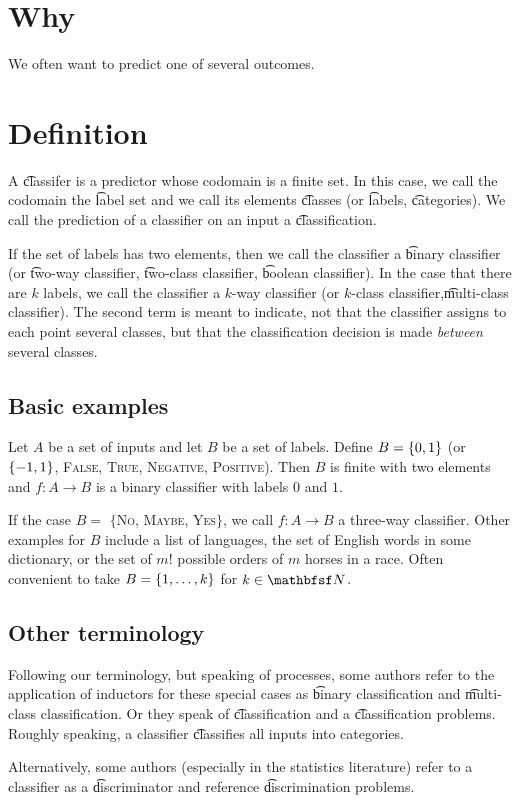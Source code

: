 
\section*{Why}

We often want to predict one of several outcomes.

\section*{Definition}

A \t{classifer} is a predictor whose codomain is a finite set.
In this case, we call the codomain the \t{label set} and we call its elements \t{classes} (or \t{labels}, \t{categories}).
We call the prediction of a classifier on an input a \t{classification}.

If the set of labels has two elements, then we call the classifier a \t{binary classifier} (or \t{two-way classifier}, \t{two-class classifier}, \t{boolean classifier}).
In the case that there are $k$ labels, we call the classifier a \t{$k$-way classifier} (or \t{$k$-class classifier},\t{multi-class classifier}).
The second term is meant to indicate, not that the classifier assigns to each point several classes, but that the classification decision is made \textit{between} several classes.

\subsection*{Basic examples}

Let $A$ be a set of inputs and let $B$ be a set of labels.
Define $B = \{0, 1\}$ (or $\{-1,1\}$, {\textsc{False}, \textsc{True}}, {\textsc{Negative}, \textsc{Positive}}).
Then $B$ is finite with two elements and $f: A \to B$ is a binary classifier with labels $0$ and $1$.

If the case $B = $ $\{$\textsc{No}, \textsc{Maybe}, \textsc{Yes}$\}$, we call $f: A \to B$ a three-way classifier.
Other examples for $B$ include a list of languages, the set of English words in some dictionary, or the set of $m!$ possible orders of $m$ horses in a race.
Often convenient to take $B = \{1, \dots , k\}$ for $k \in \N $.

\subsection*{Other terminology}

Following our terminology, but speaking of processes, some authors refer to the application of inductors for these special cases as \t{binary classification} and \t{multi-class classification}.
Or they speak of \t{classification} and a \t{classification problems}.
Roughly speaking, a classifier \t{classifies} all inputs into categories.

Alternatively, some authors (especially in the statistics literature) refer to a classifier as a \t{discriminator} and reference \t{discrimination problems}.

